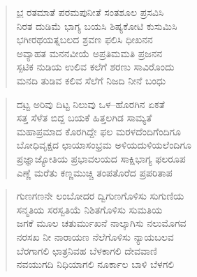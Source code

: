 \begin{verse}
\underline{ಭ} ರತಮಾತೆ ಪರಮಪುನೀತೆ ಸಂತಶೂಲ ಪ್ರಸವಿಸಿ\\
ನಿರತ ದುಡಿಮೆ ಭಾಗ್ಯ ಬಯಸಿ ಶಿಷ್ಯಕೋಟಿ ಕುಸುಮಿಸಿ\\
ಭಗೀರಥಯತ್ನಬಲದ ಶ್ರವಣ ಫಲಿಸಿ ಧೀಖನನ\\
ಅವ್ಯಾಹತ ಮನನವೀಯೆ ಅಪ್ರತಿಮಮತಿ ಪ್ರಜನನ\\
ಸ್ಪಟಿಕ ನುಡಿಯ ಉಲಿವ ಕಲೆಗೆ ಶರಣು ಸಾವಿರೊಂದು\\
ಮನದಿ ತುಡಿವ ಕಲಿವ ಸೆಲೆಗೆ ನಿಜದಿ ನೀನೆ ಬಂಧು
\end{verse}
\begin{verse}
ದ\underline{ಟ್ಟ} ಅರಿವು ದಿಟ್ಟ ನಿಲುವು ಒಳ–ಹೊರಗಿನ ಏಕತೆ\\
ಸತ್ತ ಸೆಳೆತ ಬಿದ್ದ ಬಯಕೆ ಹಿತ್ತಲಗಿಡ ಸಾಮ್ಯತೆ\\
ಮಹಾಪ್ರಮಾದ ಕೊರಗಿದ್ದೇ ಫಲ ಮರಳದೆಂದಿಗೆಂದಿಗೂ\\
ಬೋಧಿವೃಕ್ಷದ ಛಾಯಾಸಂಭ್ರಮ ಅಳಿಯದುಳಿಯಲೆಂದಿಗೂ\\
ಪ್ರಜ್ಞಾಜ್ಯೋತಿಯ ಪ್ರಭಾವಲಯದ ಸಾಕ್ಷಿಭಾಗ್ಯ ಫಲರೂಪ\\
ಎಣ್ಣೆ ಮರೆತು ಕಣ್ಣಮುಚ್ಚಿ ತಂಪತೊರೆದ ಪ್ರಪರಿತಾಪ
\end{verse}
\begin{verse}
ಗುಣಗಣನೇ ಲಂಬೋದರ ದ್ವಿಗುಣಗೊಳಿಸು ಸುಗುಣಿಯ\\
ಸನ್ಮತಿಯ ಸರಸ್ವತಿಯೆ ನಿಶಿತಗೊಳಿಸು ಸುಮತಿಯ\\
ಜಗಕೆ ಮೂಲ ಚತುರ್ಮುಖನೆ ನಾಲ್ಕಾಗಿಸು ನಲುಮೊಗವ\\
ನರಸಖ ನೀ ನಾರಾಯಣ ನೆಲೆಗೊಳಿಸು ನ್ಯಾಯಬಲವ\\
ಬೆರಗಾಗಲಿ ಛಾತ್ರನಿವಹ ಬೆಳಕಾಗಲಿ ದೇವವಾಣಿ\\
ನವಯುಗದಿ ನಿಧಿಯಾಗಲಿ ನೂರ್ಕಾಲ ಬಾಳಿ ಬೆಳಗಲಿ
\end{verse}
\articleend
